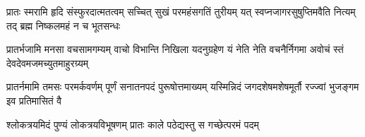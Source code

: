 
\fourlineindentedshloka
{प्रातः स्मरामि हृदि संस्फुरदात्मतत्वम्}
{सच्चित् सुखं परमहंसगतिं तुरीयम्}
{यत् स्वप्नजागरसुषुप्तिमवैति नित्यम्}
{तद् ब्रह्म निष्कलमहं न च भूतसन्धः}

\fourlineindentedshloka
{प्रातर्भजामि मनसा वचसामगम्यम्}
{वाचो विभान्ति निखिला यदनुग्रहेण}
{यं नेति नेति वचनैर्निगमा अवोचं}
{स्तं देवदेवमजमच्युतमाहुरग्र्यम्}

\fourlineindentedshloka
{प्रातर्नमामि तमसः परमर्कवर्णम्}
{पूर्णं सनातनपदं पुरूषोत्तमाख्यम्}
{यस्मिन्निदं जगदशेषमशेषमूर्तौ}
{रज्ज्वां भुजङ्गम इव प्रतिमासितं वै}

\twolineshloka
{श्लोकत्रयमिदं पुण्यं लोकत्रयविभूषणम्}
{प्रातः काले पठेद्यस्तु स गच्छेत्परमं पदम्}


\closesection
